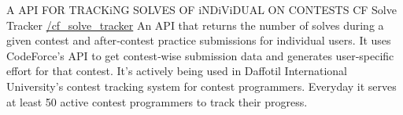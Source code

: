 \cventry
    {A API FOR TRACKiNG SOLVES OF iNDiViDUAL ON CONTESTS}
    {CF Solve Tracker}
    {\href{https://github.com/mehedi-shafi/cf\_solve\_tracker}{\faGithubSquare/cf\_solve\_tracker}}
    {}
    {
      An API that returns the number of solves during a given contest and after‑contest practice submissions for individual users. It uses CodeForce’s API to get contest‑wise submission data and generates user‑specific effort for that contest. It’s actively being used in Daffotil International University’s contest tracking system for contest programmers. Everyday it serves at least 50 active contest programmers to track their progress.
    }